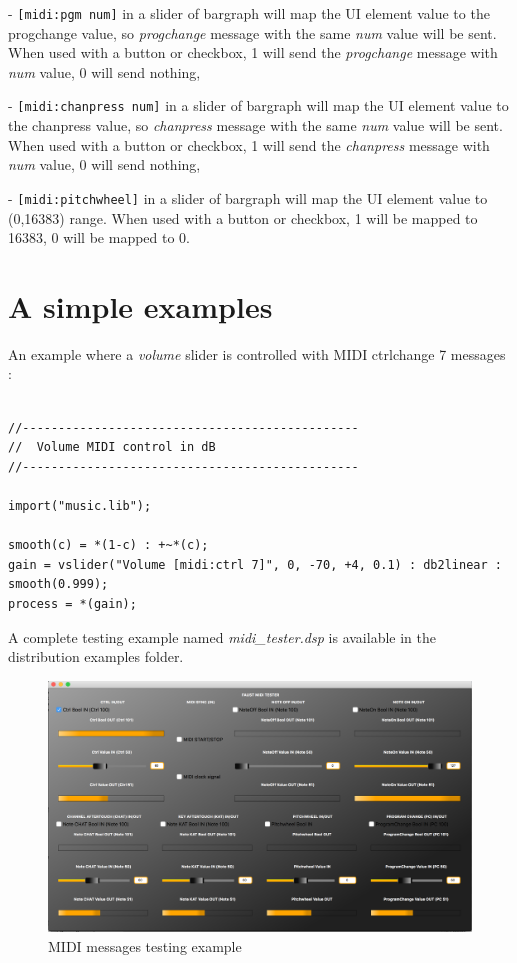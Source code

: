 - \lstinline'[midi:pgm num]' in a slider of bargraph will map the UI element value to the progchange value, so \emph{progchange} message with the same \emph{num} value will be sent. When used with a button or checkbox, 1 will send the \emph{progchange} message with \emph{num} value, 0 will send nothing,

- \lstinline'[midi:chanpress num]' in a slider of bargraph will map the UI element value to the chanpress value, so \emph{chanpress} message with the same \emph{num} value will be sent. When used with a button or checkbox, 1 will send the \emph{chanpress} message with \emph{num} value, 0 will send nothing,

- \lstinline'[midi:pitchwheel]' in a slider of bargraph will map the UI element value to (0,16383) range. When used with a button or checkbox, 1 will be mapped to 16383, 0 will be mapped to 0.

\section{A simple examples}

An example where a \emph{volume} slider is controlled with MIDI ctrlchange 7 messages :

\begin{lstlisting}

//-----------------------------------------------
//  Volume MIDI control in dB
//-----------------------------------------------

import("music.lib");

smooth(c) = *(1-c) : +~*(c);
gain = vslider("Volume [midi:ctrl 7]", 0, -70, +4, 0.1) : db2linear : smooth(0.999);
process = *(gain);

\end{lstlisting}

A complete testing example named  \emph{midi\_tester.dsp}  is available in the \faust distribution examples folder.

\begin{figure}[h!]
  \centering
  \includegraphics[width=\textwidth]{images/midi-tester.png}
  \caption{MIDI messages testing example}   
  \label{fig:midi-tester}
\end{figure}

